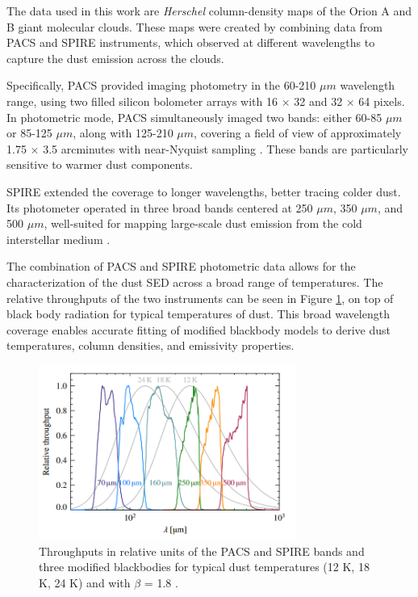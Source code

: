The data used in this work are \textit{Herschel} column-density maps of the Orion A and B giant molecular clouds. These maps were created by combining data from PACS and SPIRE instruments, which observed at different wavelengths to capture the dust emission across the clouds.

Specifically, PACS provided imaging photometry in the 60-210 $\mu m$ wavelength range, using two filled silicon bolometer arrays with 16 $\times$ 32 and 32 $\times$ 64 pixels. In photometric mode, PACS simultaneously imaged two bands: either 60-85 $\mu m$ or 85-125 $\mu m$, along with 125-210 $\mu m$, covering a field of view of approximately 1.75 $\times$ 3.5 arcminutes with near-Nyquist sampling \cite{poglitsch2010photodetector}. These bands are particularly sensitive to warmer dust components.

SPIRE extended the coverage to longer wavelengths, better tracing colder dust. Its photometer operated in three broad bands centered at 250 $\mu m$, 350 $\mu m$, and 500 $\mu m$, well-suited for mapping large-scale dust emission from the cold interstellar medium \cite{griffin2010herschel}. 

The combination of PACS and SPIRE photometric data allows for the characterization of the dust SED across a broad range of temperatures. The relative throughputs of the two instruments can be seen in Figure \ref{fig:pacs_spire_throughputs}, on top of black body radiation for typical temperatures of dust. This broad wavelength coverage enables accurate fitting of modified blackbody models to derive dust temperatures, column densities, and emissivity properties.

\begin{figure}
    \centering
    \includegraphics[width=0.75\textwidth]{figures/relative_throughputs_PACS_SPIRE.png}
    \caption{Throughputs in relative units of the PACS and SPIRE bands and three modified blackbodies for typical dust temperatures (12 K, 18 K, 24 K) and with $\beta$ = 1.8 \cite{lombardi2014herschel}.}
    \label{fig:pacs_spire_throughputs}
\end{figure}

